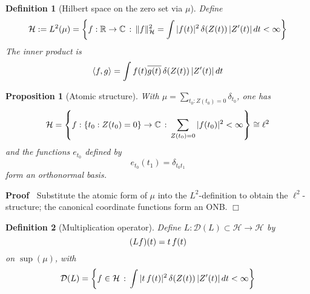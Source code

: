\documentclass{article}
\newcommand{\assign}{:=}
\newenvironment{proof}{\noindent\textbf{Proof\ }}{\hspace*{\fill}$\Box$\medskip}
\newtheorem{definition}{Definition}
\newtheorem{proposition}{Proposition}
{\theorembodyfont{\rmfamily}\newtheorem{remark}{Remark}}
\begin{document}
\begin{definition}
  [Hilbert space on the zero set via $\mu$] Define
  \begin{equation}
    \mathcal{H} \assign L^2 (\mu) = \left\{ f : \mathbb{R} \to \mathbb{C}
    \hspace{0.17em} : \hspace{0.17em} \|f\|_{\mathcal{H}}^2 = \int |f (t) |^2 
    \hspace{0.17em} \delta (Z (t)) \hspace{0.17em} |Z' (t) | \hspace{0.17em}
    dt < \infty \right\}
  \end{equation}
  The inner product is
  \begin{equation}
    \langle f, g \rangle = \int f (t) \overline{g (t)} \hspace{0.17em} \delta
    (Z (t)) \hspace{0.17em} |Z' (t) |  \hspace{0.17em} dt
  \end{equation}
\end{definition}

\begin{proposition}
  [Atomic structure] With $\mu = \sum_{t_0 : Z (t_0) = 0} \delta_{t_0}$, one
  has
  \begin{equation}
    \mathcal{H}= \left\{ f : \{t_0 : Z (t_0) = 0\} \to \mathbb{C}
    \hspace{0.17em} : \hspace{0.17em} \sum_{Z (t_0) = 0} |f (t_0) |^2 < \infty
    \right\} \cong \ell^2
  \end{equation}
  and the functions $e_{t_0}$ defined by
  \begin{equation}
    e_{t_0} (t_1) = \delta_{t_0 t_1}
  \end{equation}
  form an orthonormal basis.
\end{proposition}

\begin{proof}
  Substitute the atomic form of $\mu$ into the $L^2$-definition to obtain the
  $\ell^2$-structure; the canonical coordinate functions form an ONB.
\end{proof}

\begin{definition}
  [Multiplication operator] Define $L : \mathcal{D} (L) \subset \mathcal{H}
  \to \mathcal{H}$ by
  \begin{equation}
    (Lf) (t) = t \hspace{0.17em} f (t)
  \end{equation}
  on $\sup (\mu)$, with
  \begin{equation}
    \mathcal{D} (L) = \left\{ f \in \mathcal{H} \hspace{0.17em} :
    \hspace{0.17em} \int |t \hspace{0.17em} f (t) |^2  \hspace{0.17em} \delta
    (Z (t)) \hspace{0.17em} |Z' (t) | \hspace{0.17em} dt < \infty \right\}
  \end{equation}
\end{definition}
\end{document}
